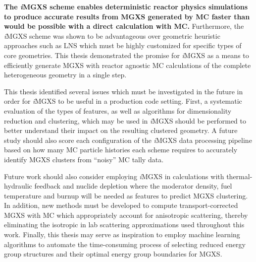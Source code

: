 
\textbf{The \textit{i}MGXS scheme enables deterministic reactor physics simulations to produce accurate results from MGXS generated by MC faster than would be possible with a direct calculation with MC.} Furthermore, the \textit{i}MGXS scheme was shown to be advantageous over geometric heuristic approaches such as LNS which must be highly customized for specific types of core geometries. This thesis demonstrated the promise for \textit{i}MGXS as a means to efficiently generate MGXS with reactor agnostic MC calculations of the complete heterogeneous geometry in a single step.

This thesis identified several issues which must be investigated in the future in order for \textit{i}MGXS to be useful in a production code setting. First, a systematic evaluation of the types of features, as well as algorithms for dimensionality reduction and clustering, which may be used in \textit{i}MGXS should be performed to better understand their impact on the resulting clustered geometry. A future study should also score each configuration of the \textit{i}MGXS data processing pipeline based on how many MC particle histories  each scheme requires to accurately identify MGXS clusters from ``noisy'' MC tally data. 

Future work should also consider employing \textit{i}MGXS in calculations with thermal-hydraulic feedback and nuclide depletion where the moderator density, fuel temperature and burnup will be needed as features to predict MGXS clustering. In addition, new methods must be developed to compute transport-corrected MGXS with MC which appropriately account for anisotropic scattering, thereby eliminating the isotropic in lab scattering approximations used throughout this work. Finally, this thesis may serve as inspiration to employ machine learning algorithms to automate the time-consuming process of selecting reduced energy group structures and their optimal energy group boundaries for MGXS.


